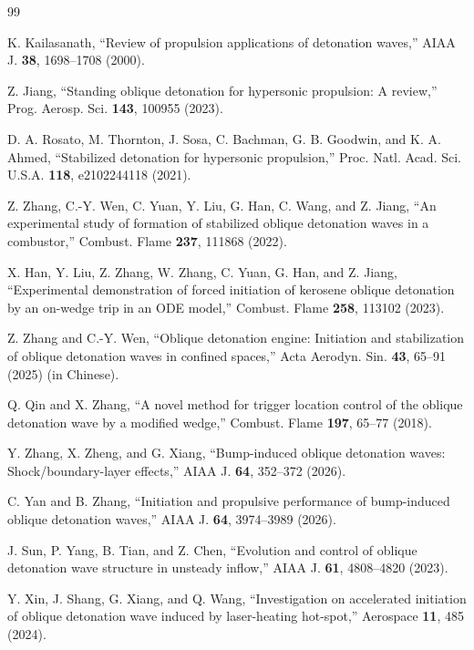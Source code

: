 \documentclass[aip,pof,preprint,amsmath,amssymb]{revtex4-2}
\begin{document}
\begin{thebibliography}{99}

 K. Kailasanath, ``Review of propulsion applications of detonation waves,'' AIAA J. \textbf{38}, 1698--1708 (2000).

 Z. Jiang, ``Standing oblique detonation for hypersonic propulsion: A review,'' Prog. Aerosp. Sci. \textbf{143}, 100955 (2023).

 D. A. Rosato, M. Thornton, J. Sosa, C. Bachman, G. B. Goodwin, and K. A. Ahmed, ``Stabilized detonation for hypersonic propulsion,'' Proc. Natl. Acad. Sci. U.S.A. \textbf{118}, e2102244118 (2021).

 Z. Zhang, C.-Y. Wen, C. Yuan, Y. Liu, G. Han, C. Wang, and Z. Jiang, ``An experimental study of formation of stabilized oblique detonation waves in a combustor,'' Combust. Flame \textbf{237}, 111868 (2022).

 X. Han, Y. Liu, Z. Zhang, W. Zhang, C. Yuan, G. Han, and Z. Jiang, ``Experimental demonstration of forced initiation of kerosene oblique detonation by an on-wedge trip in an ODE model,'' Combust. Flame \textbf{258}, 113102 (2023).

 Z. Zhang and C.-Y. Wen, ``Oblique detonation engine: Initiation and stabilization of oblique detonation waves in confined spaces,'' Acta Aerodyn. Sin. \textbf{43}, 65--91 (2025) (in Chinese).

 Q. Qin and X. Zhang, ``A novel method for trigger location control of the oblique detonation wave by a modified wedge,'' Combust. Flame \textbf{197}, 65--77 (2018).

 Y. Zhang, X. Zheng, and G. Xiang, ``Bump-induced oblique detonation waves: Shock/boundary-layer effects,'' AIAA J. \textbf{64}, 352--372 (2026).

 C. Yan and B. Zhang, ``Initiation and propulsive performance of bump-induced oblique detonation waves,'' AIAA J. \textbf{64}, 3974--3989 (2026).

 J. Sun, P. Yang, B. Tian, and Z. Chen, ``Evolution and control of oblique detonation wave structure in unsteady inflow,'' AIAA J. \textbf{61}, 4808--4820 (2023).

 Y. Xin, J. Shang, G. Xiang, and Q. Wang, ``Investigation on accelerated initiation of oblique detonation wave induced by laser-heating hot-spot,'' Aerospace \textbf{11}, 485 (2024).


\end{thebibliography}
\end{document}
